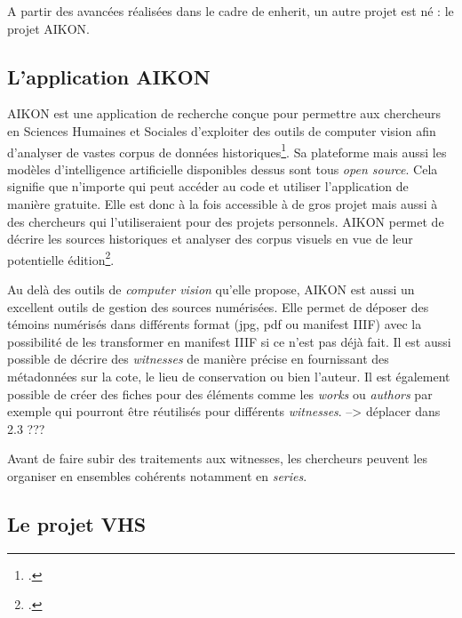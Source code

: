 A partir des avancées réalisées dans le cadre de \gls{enherit}, un autre projet est né : le projet AIKON.

\subsection{L'application AIKON}

AIKON est une application de recherche conçue pour permettre aux chercheurs en Sciences Humaines et Sociales d'exploiter des outils de computer vision afin d'analyser de vastes corpus de données historiques\footcite{aikonAikonplatformAikon2025}. 
Sa plateforme mais aussi les modèles d'intelligence artificielle disponibles dessus sont tous \textit{open source}. Cela signifie que n'importe qui peut accéder au code et utiliser l'application de manière gratuite. Elle est donc à la fois accessible à de gros projet mais aussi à des chercheurs qui l'utiliseraient pour des projets personnels. 
AIKON permet de décrire les sources historiques et analyser des corpus visuels en vue de leur potentielle édition\footcite{albouyAIKONComputerVision}.

Au delà des outils de \textit{computer vision} qu'elle propose, AIKON est aussi un excellent outils de gestion des sources numérisées. Elle permet de déposer des témoins numérisés dans différents format (jpg, pdf ou manifest IIIF) avec la possibilité de les transformer en manifest IIIF si ce n'est pas déjà fait. Il est aussi possible de décrire des \textit{witnesses} de manière précise en fournissant des métadonnées sur la cote, le lieu de conservation ou bien l'auteur. Il est également possible de créer des fiches pour des éléments comme les \textit{works} ou \textit{authors} par exemple qui pourront être réutilisés pour différents \textit{witnesses}.   --> déplacer dans 2.3 ???

Avant de faire subir des traitements aux witnesses, les chercheurs peuvent les organiser en ensembles cohérents notamment en \textit{series}.


\subsection{Le projet VHS}

